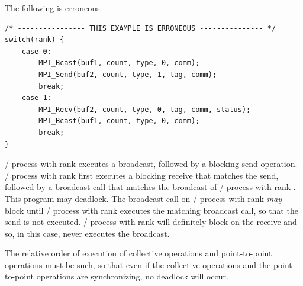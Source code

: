 \begin{example}
\label{coll-exM}
%
%
The following is erroneous.

\begin{lstlisting}[language={[MPI]C}]
/* ---------------- THIS EXAMPLE IS ERRONEOUS --------------- */
switch(rank) {
    case 0:
        MPI_Bcast(buf1, count, type, 0, comm);
        MPI_Send(buf2, count, type, 1, tag, comm);
        break;
    case 1:
        MPI_Recv(buf2, count, type, 0, tag, comm, status);
        MPI_Bcast(buf1, count, type, 0, comm);
        break;
}
\end{lstlisting}

\MPI/ process with rank  executes a broadcast, followed by a blocking send operation.
\MPI/ process with rank  first executes a blocking receive that matches the send,
followed by a broadcast call that matches the broadcast of \MPI/ process with rank .
This program may deadlock.  The broadcast call on \MPI/ process with rank 
\emph{may} block until \MPI/ process with rank  executes the matching
broadcast call, so that the
send is not executed.  \MPI/ process with rank  will definitely block on the
receive and so, in this case, never executes the
broadcast.

The relative order of execution of collective operations and point-to-point
operations must be such, so that even if the collective
operations and the point-to-point operations are synchronizing, no
deadlock will occur.
\end{example}

